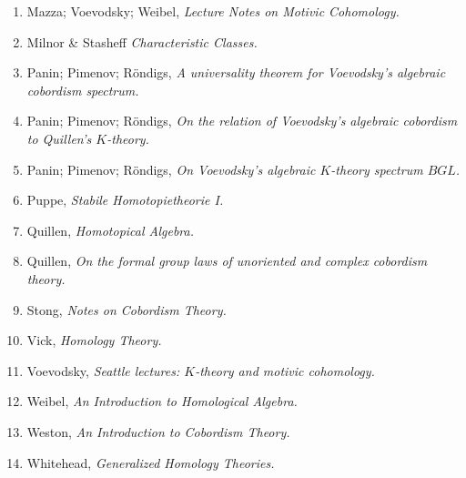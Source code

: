 \documentclass{article}%
\begin{document}
\begin{enumerate}
\item Mazza; Voevodsky; Weibel, {\it Lecture Notes on Motivic Cohomology.}
\item Milnor \& Stasheff {\it Characteristic Classes.}
\item Panin; Pimenov; R\"ondigs, {\it A universality theorem for Voevodsky's algebraic cobordism spectrum.}
\item Panin; Pimenov; R\"ondigs, {\it On the relation of Voevodsky's algebraic cobordism to Quillen's $K$-theory.}
\item Panin; Pimenov; R\"ondigs, {\it On Voevodsky's algebraic $K$-theory spectrum $BGL$.}
\item Puppe, {\it Stabile Homotopietheorie I.}
\item Quillen, {\it Homotopical Algebra.}
\item Quillen, {\it On the formal group laws of unoriented and complex cobordism theory.}
\item Stong, {\it Notes on Cobordism Theory.}
\item Vick, {\it Homology Theory.}
\item Voevodsky, {\it Seattle lectures: $K$-theory and motivic cohomology.}
\item Weibel, {\it An Introduction to Homological Algebra.}
\item Weston, {\it An Introduction to Cobordism Theory.}
\item Whitehead, {\it Generalized Homology Theories.} 
\end{enumerate}
\end{document}
